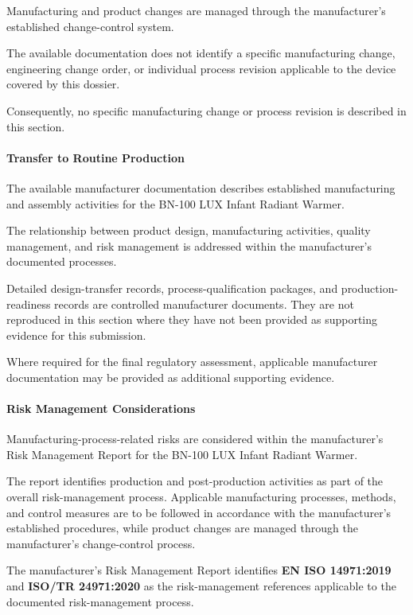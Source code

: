 Manufacturing and product changes are managed through the
manufacturer's established change-control system.

The available documentation does not identify a specific
manufacturing change, engineering change order, or individual
process revision applicable to the device covered by this dossier.

Consequently, no specific manufacturing change or process revision
is described in this section.

\paragraph{Transfer to Routine Production}

The available manufacturer documentation describes established
manufacturing and assembly activities for the BN-100 LUX Infant
Radiant Warmer.

The relationship between product design, manufacturing activities,
quality management, and risk management is addressed within the
manufacturer's documented processes.

Detailed design-transfer records, process-qualification packages,
and production-readiness records are controlled manufacturer
documents. They are not reproduced in this section where they
have not been provided as supporting evidence for this submission.

Where required for the final regulatory assessment, applicable
manufacturer documentation may be provided as additional
supporting evidence.

\paragraph{Risk Management Considerations}

Manufacturing-process-related risks are considered within the
manufacturer's Risk Management Report for the BN-100 LUX Infant
Radiant Warmer.

The report identifies production and post-production activities
as part of the overall risk-management process. Applicable
manufacturing processes, methods, and control measures are to be
followed in accordance with the manufacturer's established
procedures, while product changes are managed through the
manufacturer's change-control process.

The manufacturer's Risk Management Report identifies
\textbf{EN ISO 14971:2019} and \textbf{ISO/TR 24971:2020} as the
risk-management references applicable to the documented
risk-management process.


